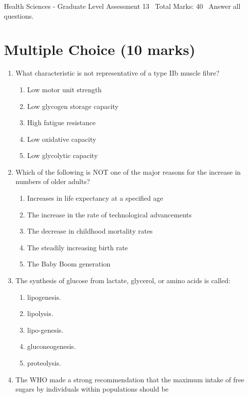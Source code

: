 \documentclass[12pt]{article}
\begin{document}
\begin{center}
Health Sciences - Graduate Level Assessment 13 \
Total Marks: 40 \
Answer all questions.
\end{center}

\section*{Multiple Choice (10 marks)}
\begin{enumerate}[label=\arabic*.]
\item What characteristic is not representative of a type IIb muscle fibre?
\begin{enumerate}[label=(\alph*)]
    \item Low motor unit strength
    \item Low glycogen storage capacity
    \item High fatigue resistance
    \item Low oxidative capacity
    \item Low glycolytic capacity
\end{enumerate}
\item Which of the following is NOT one of the major reasons for the increase in numbers of older adults?
\begin{enumerate}[label=(\alph*)]
    \item Increases in life expectancy at a specified age
    \item The increase in the rate of technological advancements
    \item The decrease in childhood mortality rates
    \item The steadily increasing birth rate
    \item The Baby Boom generation
\end{enumerate}
\item The synthesis of glucose from lactate, glycerol, or amino acids is called:
\begin{enumerate}[label=(\alph*)]
    \item lipogenesis.
    \item lipolysis.
    \item lipo-genesis.
    \item gluconeogenesis.
    \item proteolysis.
\end{enumerate}
\item The WHO made a strong recommendation that the maximum intake of free sugars by individuals within populations should be
\begin{enumerate}[label=(\alph*)]

\end{enumerate}
\end{enumerate}
\end{document}
